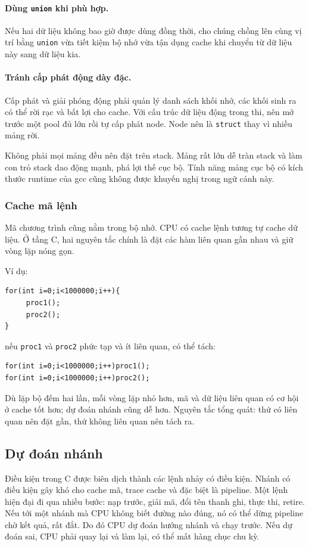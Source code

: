 \documentclass[11pt]{article}
\begin{document}
\paragraph{Dùng \texttt{union} khi phù hợp.}
Nếu hai dữ liệu không bao giờ được dùng đồng thời, cho chúng chồng lên cùng
vị trí bằng \texttt{union} vừa tiết kiệm bộ nhớ vừa tận dụng cache khi chuyển
từ dữ liệu này sang dữ liệu kia.

\paragraph{Tránh cấp phát động dày đặc.}
Cấp phát và giải phóng động phải quản lý danh sách khối nhớ, các khối sinh ra
có thể rời rạc và bất lợi cho cache. Với cấu trúc dữ liệu động trong thi, nên
mở trước một pool đủ lớn rồi tự cấp phát node. Node nên là \texttt{struct}
thay vì nhiều mảng rời.

Không phải mọi mảng đều nên đặt trên stack. Mảng rất lớn dễ tràn stack và làm
con trỏ stack dao động mạnh, phá lợi thế cục bộ. Tính năng mảng cục bộ có
kích thước runtime của gcc cũng không được khuyến nghị trong ngữ cảnh này.

\subsubsection{Cache mã lệnh}

Mã chương trình cũng nằm trong bộ nhớ. CPU có cache lệnh tương tự cache dữ
liệu. Ở tầng C, hai nguyên tắc chính là đặt các hàm liên quan gần nhau và giữ
vòng lặp nóng gọn.

Ví dụ:
\begin{verbatim}
for(int i=0;i<1000000;i++){
     proc1();
     proc2();
}
\end{verbatim}
nếu \texttt{proc1} và \texttt{proc2} phức tạp và ít liên quan, có thể tách:
\begin{verbatim}
for(int i=0;i<1000000;i++)proc1();
for(int i=0;i<1000000;i++)proc2();
\end{verbatim}
Dù lặp bộ đếm hai lần, mỗi vòng lặp nhỏ hơn, mã và dữ liệu liên quan có cơ
hội ở cache tốt hơn; dự đoán nhánh cũng dễ hơn. Nguyên tắc tổng quát: thứ có
liên quan nên đặt gần, thứ không liên quan nên tách ra.

\subsection{Dự đoán nhánh}

Điều kiện trong C được biên dịch thành các lệnh nhảy có điều kiện. Nhánh có
điều kiện gây khó cho cache mã, trace cache và đặc biệt là pipeline. Một lệnh
hiện đại đi qua nhiều bước: nạp trước, giải mã, đổi tên thanh ghi, thực thi,
retire. Nếu tới một nhánh mà CPU không biết đường nào đúng, nó có thể dừng
pipeline chờ kết quả, rất đắt. Do đó CPU dự đoán hướng nhánh và chạy trước.
Nếu dự đoán sai, CPU phải quay lại và làm lại, có thể mất hàng chục chu kỳ.
\end{document}

